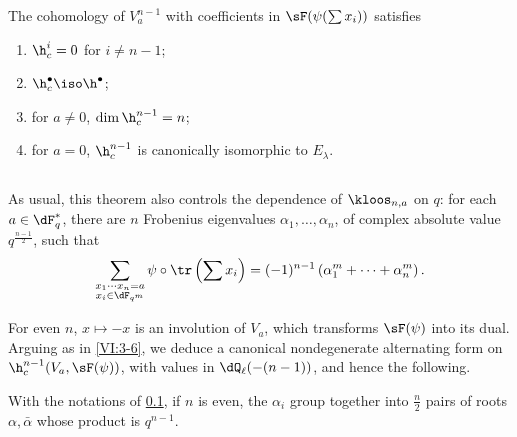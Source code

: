 \begin{theorem_}\label{VI:7-4}
The cohomology of $V_a^{n-1}$ with coefficients in $\sF(\psi(\sum x_i))$ satisfies 
\begin{enumerate}[\indent (i)]
  \item $\h_c^i=0$ for $i\ne n-1$; 
  \item $\h_c^\bullet{} \iso \h^\bullet{}$; 
  \item for $a\ne 0$, $\dim \h_c^{n-1}{}=n$; 
\item for $a=0$, $\h_c^{n-1}{}$ is canonically isomorphic to $E_\lambda$. 
\end{enumerate}
\end{theorem_}





\subsection{}\label{VI:7-5}

As usual, this theorem also controls the dependence of 
$\kloos_{n,a}$ on $q$: for each $a\in \dF_q^\ast$, there are $n$ Frobenius 
eigenvalues $\alpha_1,\dots,\alpha_n$, of complex absolute value 
$q^{\frac{n-1}{2}}$, such that 
\[
  \sum_{\substack{x_1\dotsm x_n = a \\ x_i\in \dF_{q^m}}} \psi\circ \tr\left(\sum x_i\right) = (-1)^{n-1} \left(\alpha_1^m + \cdots + \alpha_n^m \right) \text{.} 
\]

For even $n$, $x\mapsto -x$ is an involution of $V_a$, which transforms 
$\sF(\psi)$ into its dual. Arguing as in \ref{VI:3-6}, we deduce a 
canonical nondegenerate alternating form on $\h_c^{n-1}(V_a,\sF(\psi))$, 
with values in $\dQ_\ell(-(n-1))$, and hence the following. 





\begin{corollary_}\label{VI:7-6}
With the notations of \ref{VI:7-5}, if $n$ is even, the $\alpha_i$ group together 
into $\frac n 2$ pairs of roots $\alpha,\bar\alpha$ whose product is 
$q^{n-1}$. 
\end{corollary_}





\subsection{}\label{VI:7-7}

